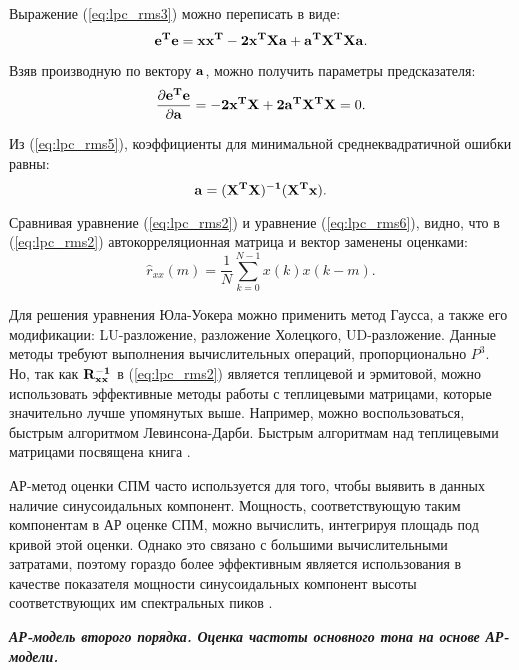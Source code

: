 Выражение (\ref{eq:lpc_rms3}) можно переписать в виде:
\begin{equation}
	\label{eq:lpc_rms4}
	{\bf e^T e = xx^T - 2x^T Xa + a^T X^T Xa}.
\end{equation}

Взяв производную по вектору ${{\bf a}}$, можно получить параметры предсказателя:
\begin{equation}
	\label{eq:lpc_rms5}
	\frac{\partial {\bf e^T e}}{\partial {\bf a}} = {\bf - 2x^T X + 2a^T X^T X} = 0.
\end{equation}

Из (\ref{eq:lpc_rms5}), коэффициенты для минимальной среднеквадратичной ошибки равны:
\begin{equation}
	\label{eq:lpc_rms6}
	{\bf a= (X^T X)^{-1} (X^T x)}.
\end{equation}

Сравнивая уравнение (\ref{eq:lpc_rms2}) и уравнение (\ref{eq:lpc_rms6}), видно, что в (\ref{eq:lpc_rms2})
автокорреляционная матрица и вектор заменены оценками:
\begin{equation}
	\label{eq:lpc_rxx_estimation}
	\hat{r}_{xx}(m) = \frac{1}{N} \sum \limits_{k=0}^{N-1} x(k)x(k-m).
\end{equation}

Для решения уравнения Юла-Уокера можно применить метод Гаусса, а также его модификации: LU-разложение,
разложение Холецкого, UD-разложение. Данные методы требуют выполнения вычислительных операций, пропорционально ${P^3}$.
Но, так как ${\bf{R^{-1}_{xx}}}$ в (\ref{eq:lpc_rms2}) является теплицевой и эрмитовой, можно использовать эффективные методы работы
с теплицевыми матрицами, которые значительно лучше упомянутых выше. 
Например, можно воспользоваться, быстрым алгоритмом Левинсона-Дарби.
Быстрым алгоритмам над теплицевыми матрицами посвящена книга \cite{bleyhut_book}.

АР-метод оценки СПМ часто используется для того, чтобы выявить в данных наличие синусоидальных
компонент. Мощность, соответствующую  таким компонентам в АР оценке СПМ, можно вычислить, интегрируя
площадь под кривой этой оценки. Однако это связано с большими вычислительными затратами, поэтому
гораздо более эффективным является использования в качестве показателя мощности синусоидальных
компонент высоты соответствующих им спектральных пиков \cite{marpl_book}.  

{\bf{\textit{АР-модель второго порядка. Оценка частоты основного тона на основе АР-модели.}}}


